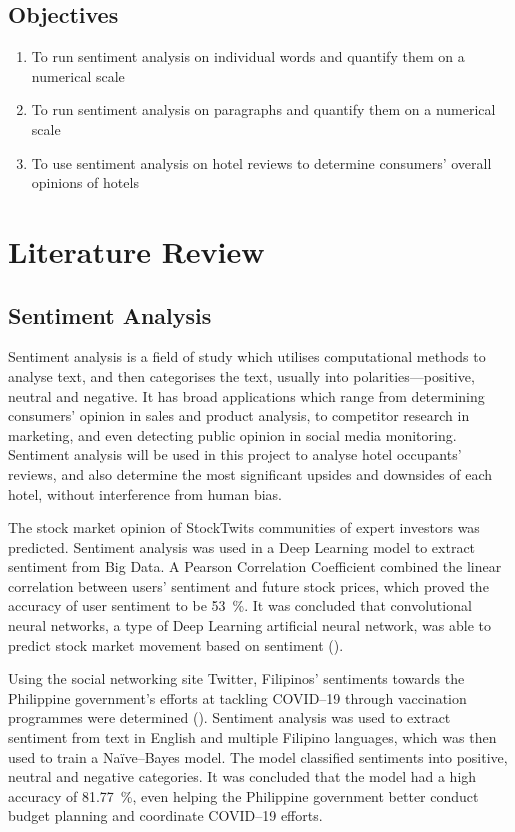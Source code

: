 \documentclass[
	fontsize=12pt,
	paper=a4,
	bibliography=totocnumbered, 
]{scrartcl}
\begin{document}
				\subsection{Objectives}
				\begin{enumerate}
					\item To run sentiment analysis on individual words and quantify them on a numerical scale
					\item To run sentiment analysis on paragraphs and quantify them on a numerical scale
					\item To use sentiment analysis on hotel reviews to determine consumers' overall opinions of hotels
				\end{enumerate}

				\section{Literature Review}

				\subsection{Sentiment Analysis}

				Sentiment analysis is a field of study which utilises computational methods to analyse text,
				and then categorises the text, usually into polarities---positive, neutral
				and negative. It has broad applications which range from determining consumers' opinion in
				sales and product analysis, to competitor research in marketing, and even detecting public
				opinion in social media monitoring. Sentiment analysis will be used in this project to
				analyse hotel occupants' reviews, and also determine the most significant upsides
				and downsides of each hotel, without interference from human bias.

				The stock market opinion of StockTwits communities
				of expert investors was predicted. Sentiment analysis was used in a Deep Learning model to extract
				sentiment from Big Data. A Pearson Correlation Coefficient combined the linear correlation
				between users' sentiment and future stock prices, which
				proved the accuracy of user sentiment to be \qty{53}{\percent}.
				It was concluded that convolutional neural networks, a type of Deep Learning
				artificial neural network, was able to predict stock market movement based on sentiment (\cite{stock}).

				Using the social networking site Twitter,
				Filipinos' sentiments towards the Philippine government's efforts
				at tackling COVID--19 through vaccination programmes were determined (\cite{twitter}).
				Sentiment analysis was used to extract sentiment from text in English and multiple Filipino languages,
				which was then used to train a Na{\"i}ve--Bayes model. The model classified
				sentiments into positive, neutral and negative categories. It was concluded that
				the model had a high accuracy of \qty{81.77}{\percent}, even helping the
				Philippine government better conduct budget planning and coordinate COVID--19 efforts.
\end{document}
